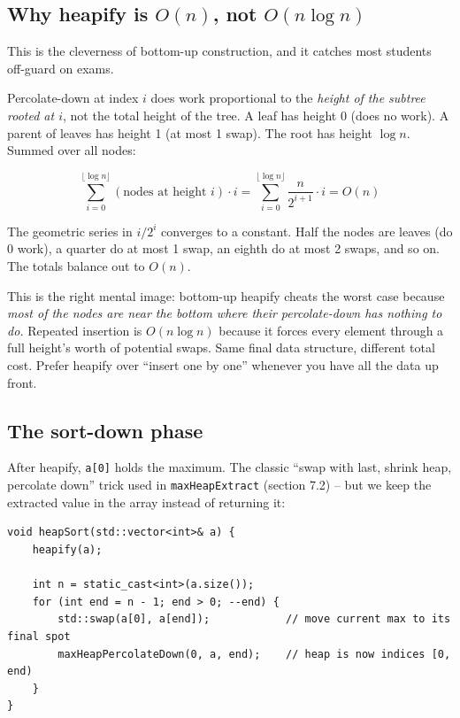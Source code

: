 \documentclass[11pt]{article}
\begin{document}
\subsection*{Why heapify is $O(n)$, not $O(n \log n)$}

This is the cleverness of bottom-up construction, and it catches most students off-guard on exams.

Percolate-down at index $i$ does work proportional to the \emph{height of the subtree rooted at $i$}, not the total height of the tree. A leaf has height 0 (does no work). A parent of leaves has height 1 (at most 1 swap). The root has height $\log n$. Summed over all nodes:

\[
\sum_{i=0}^{\lfloor \log n \rfloor} (\text{nodes at height } i) \cdot i
= \sum_{i=0}^{\lfloor \log n \rfloor} \frac{n}{2^{i+1}} \cdot i
= O(n)
\]

The geometric series in $i/2^i$ converges to a constant. Half the nodes are leaves (do 0 work), a quarter do at most 1 swap, an eighth do at most 2 swaps, and so on. The totals balance out to $O(n)$.

\begin{ideabox}
This is the right mental image: bottom-up heapify cheats the worst case because \emph{most of the nodes are near the bottom where their percolate-down has nothing to do.} Repeated insertion is $O(n \log n)$ because it forces every element through a full height's worth of potential swaps. Same final data structure, different total cost. Prefer heapify over ``insert one by one'' whenever you have all the data up front.
\end{ideabox}

\subsection*{The sort-down phase}

After heapify, \texttt{a[0]} holds the maximum. The classic ``swap with last, shrink heap, percolate down'' trick used in \texttt{maxHeapExtract} (section 7.2) -- but we keep the extracted value in the array instead of returning it:

\begin{lstlisting}
void heapSort(std::vector<int>& a) {
    heapify(a);

    int n = static_cast<int>(a.size());
    for (int end = n - 1; end > 0; --end) {
        std::swap(a[0], a[end]);            // move current max to its final spot
        maxHeapPercolateDown(0, a, end);    // heap is now indices [0, end)
    }
}
\end{lstlisting}
\end{document}
